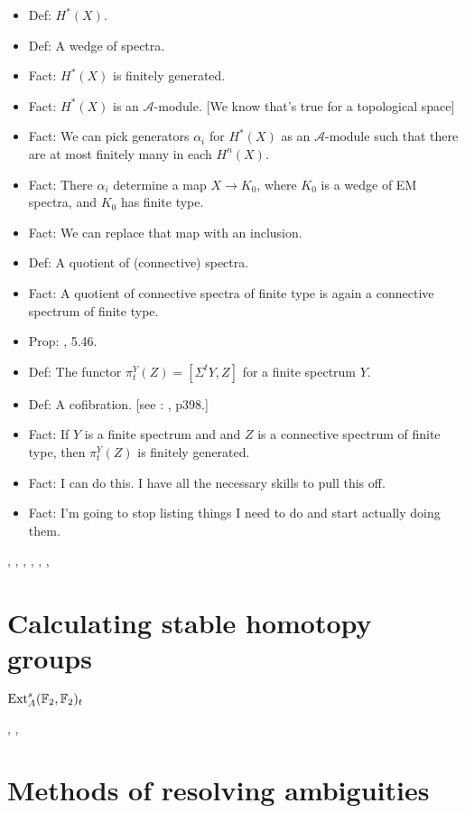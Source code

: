 \documentclass{MetricNotes2023}
\def\bb{\ensuremath\mathbb}
\DeclareMathOperator{\Ext}{Ext}
\begin{document}
\begin{itemize}
\item Def: \(H^*(X)\).
\item Def: A wedge of spectra.
\item Fact: \(H^*(X)\) is finitely generated.
\item Fact: \(H^*(X)\) is an \(\mathscr{A}\)-module. [We know that's true for a topological space]
\item Fact: We can pick generators \(\alpha_i\) for \(H^*(X)\) as an \(\mathscr{A}\)-module such that there are at most finitely many in each \(H^n(X)\).
\item Fact: There \(\alpha_i\) determine a map \(X \to K_0\), where \(K_0\) is a wedge of EM spectra, and \(K_0\) has finite type.
\item Fact: We can replace that map with an inclusion.
\item Def: A quotient of (connective) spectra.
\item Fact: A quotient of connective spectra of finite type is again a connective spectrum of finite type.
\item Prop: \autocite{hatcher5}, 5.46.
\item Def: The functor \(\pi^Y_t(Z)=[\Sigma^tY, Z]\) for a finite spectrum \(Y\).
\item Def: A cofibration. [see : \autocite{hatcher}, p398.]
\item Fact: If \(Y\) is a finite spectrum and and \(Z\) is a connective spectrum of finite type, then \(\pi^Y_t(Z)\) is finitely generated.
\item Fact: I can do this. I have all the necessary skills to pull this off. 
\item Fact: I'm going to stop listing things I need to do and start actually doing them.
\end{itemize}

\autocite{spectral_sequences}, \autocite{stable_homotopy}, \autocite{cobordism}, \autocite{foundations}, \autocite{hatcher5}, \autocite{ass}, \autocite{primer}

\section{Calculating stable homotopy groups}

\(\Ext_A^s(\bb{F}_2, \bb{F}_2)_t\)

\autocite{stable_homotopy}, \autocite{cobordism}, \autocite{ass}

\section{Methods of resolving ambiguities}
\end{document}
